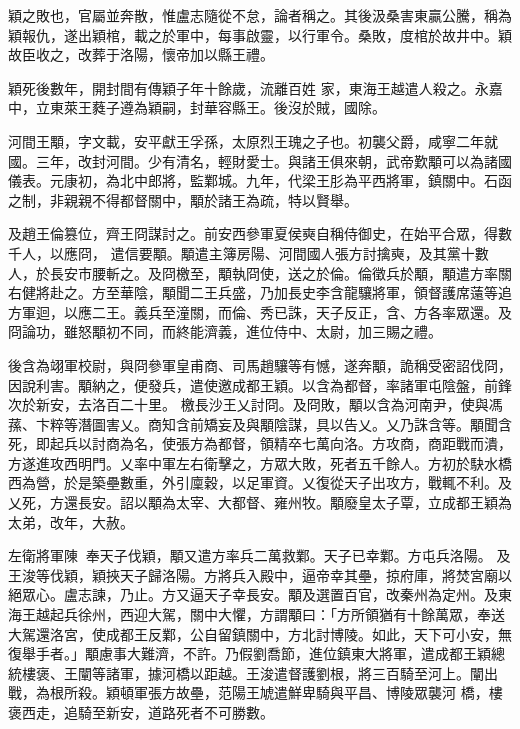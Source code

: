 \begin{pinyinscope}
 穎之敗也，官屬並奔散，惟盧志隨從不怠，論者稱之。其後汲桑害東贏公騰，稱為穎報仇，遂出穎棺，載之於軍中，每事啟靈，以行軍令。桑敗，度棺於故井中。穎故臣收之，改葬于洛陽，懷帝加以縣王禮。



 穎死後數年，開封間有傳穎子年十餘歲，流離百姓
 家，東海王越遣人殺之。永嘉中，立東萊王蕤子遵為穎嗣，封華容縣王。後沒於賊，國除。



 河間王顒，字文載，安平獻王孚孫，太原烈王瑰之子也。初襲父爵，咸寧二年就國。三年，改封河間。少有清名，輕財愛士。與諸王俱來朝，武帝歎顒可以為諸國儀表。元康初，為北中郎將，監鄴城。九年，代梁王肜為平西將軍，鎮關中。石函之制，非親親不得都督關中，顒於諸王為疏，特以賢舉。



 及趙王倫篡位，齊王冏謀討之。前安西參軍夏侯奭自稱侍御史，在始平合眾，得數千人，以應冏，
 遣信要顒。顒遣主簿房陽、河間國人張方討擒奭，及其黨十數人，於長安市腰斬之。及冏檄至，顒執冏使，送之於倫。倫徵兵於顒，顒遣方率關右健將赴之。方至華陰，顒聞二王兵盛，乃加長史李含龍驤將軍，領督護席薳等追方軍迴，以應二王。義兵至潼關，而倫、秀已誅，天子反正，含、方各率眾還。及冏論功，雖怒顒初不同，而終能濟義，進位侍中、太尉，加三賜之禮。



 後含為翊軍校尉，與冏參軍皇甫商、司馬趙驤等有憾，遂奔顒，詭稱受密詔伐冏，因說利害。顒納之，便發兵，遣使邀成都王穎。以含為都督，率諸軍屯陰盤，前鋒次於新安，去洛百二十里。
 檄長沙王乂討冏。及冏敗，顒以含為河南尹，使與馮蓀、卞粹等潛圖害乂。商知含前矯妄及與顒陰謀，具以告乂。乂乃誅含等。顒聞含死，即起兵以討商為名，使張方為都督，領精卒七萬向洛。方攻商，商距戰而潰，方遂進攻西明門。乂率中軍左右衛擊之，方眾大敗，死者五千餘人。方初於駃水橋西為營，於是築壘數重，外引廩穀，以足軍資。乂復從天子出攻方，戰輒不利。及乂死，方還長安。詔以顒為太宰、大都督、雍州牧。顒廢皇太子覃，立成都王穎為太弟，改年，大赦。



 左衛將軍陳奉天子伐穎，顒又遣方率兵二萬救鄴。天子已幸鄴。方屯兵洛陽。
 及王浚等伐穎，穎挾天子歸洛陽。方將兵入殿中，逼帝幸其壘，掠府庫，將焚宮廟以絕眾心。盧志諫，乃止。方又逼天子幸長安。顒及選置百官，改秦州為定州。及東海王越起兵徐州，西迎大駕，關中大懼，方謂顒曰：「方所領猶有十餘萬眾，奉送大駕還洛宮，使成都王反鄴，公自留鎮關中，方北討博陵。如此，天下可小安，無復舉手者。」顒慮事大難濟，不許。乃假劉喬節，進位鎮東大將軍，遣成都王穎總統樓褒、王闡等諸軍，據河橋以距越。王浚遣督護劉根，將三百騎至河上。闡出戰，為根所殺。穎頓軍張方故壘，范陽王虓遣鮮卑騎與平昌、博陵眾襲河
 橋，樓褒西走，追騎至新安，道路死者不可勝數。




\end{pinyinscope}
